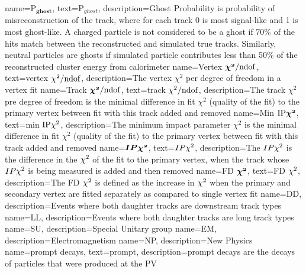 {
	name=P$\mathbold{_{ghost}}$,%
		text=P$_{ghost}$,
		description={Ghost Probability is probability of misreconstruction of the track, where for each track 0 is most signal-like and 1 is most ghost-like. A charged particle is not considered to be a ghost if 70$\%$ of the hits match between the reconstructed and simulated true tracks. Similarly, neutral particles are ghosts if simulated particle contributes less than 50$\%$ of the reconstructed cluster energy from calorimeter} 
}                
{
	        name={Vertex $\mathbold{\chisq/\rm{ndof}}$},
		text={vertex ${\chi^2/\rm{ndof}}$},
		description={The vertex $\chi^{2}$ per degree of freedom in a vertex fit} %
		}
{
	        name={Track $\mathbold{\chisq/\rm{ndof}}$},
		text={track $\chi^2/\rm{ndof}$},
		description={The track $\chi^{2}$ pre degree of freedom is the minimal difference in fit $\chi^{2}$ (quality of the fit) to the primary vertex between fit with this track added  and removed} %
		}
{
	        name={Min $\mathbold{\mathrm{IP}\chisq}$},
		text={min $\mathrm{IP}\chi^2$},
		description={The minimum impact parameter $\chi^{2}$ is the minimal difference in fit $\chi^{2}$ (quality of the fit) to the primary vertex between fit with this track added  and removed} %
		}
{
	name=$\mathbold{IP\chisq}$,
		text=$IP\chi^2$,
		description={The $IP\chi^2$ is the difference in the $\chi^2$ of the fit to the primary vertex, when the track whose $IP\chi^2$ is being measured is added and then removed}
} 
{
	        name=FD $\mathbold{\chisq}$,
		text=FD $\chi^2$,
		description={The \Gls{FD} $\chi^2$ is defined as the increase in $\chi^2$ when the primary and secondary vertex are fitted separately as compared to single vertex fit}
}                
{
	name=DD,
		description={Events where both daughter tracks are downstream track types}
}
{
	name=LL,
		description={Events where both daughter tracks are long track types}
}
{
	name=SU,
		description={Special Unitary group}
}                 
{
	name=EM,
		description={Electromagnetism}
}                 
{
	name=NP,
		description={New Physics}
}
{
	name=prompt decays,
		text=prompt,
		description={prompt decays are the decays of particles that were produced at the \Gls{PV}}
}

